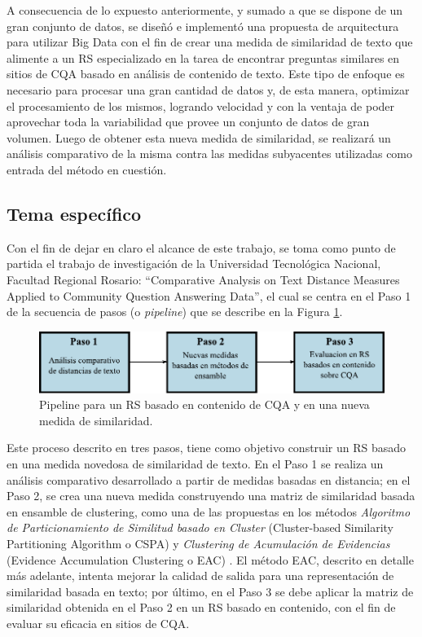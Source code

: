 \bigskip A consecuencia de lo expuesto anteriormente, y sumado a que se dispone de un gran conjunto de datos, se diseñó e implementó una propuesta de arquitectura para utilizar Big Data con el fin de crear una medida de similaridad de texto que alimente a un RS especializado en la tarea de encontrar preguntas similares en sitios de CQA basado en análisis de contenido de texto. Este tipo de enfoque es necesario para procesar una gran cantidad de datos y, de esta manera, optimizar el procesamiento de los mismos, logrando velocidad y con la ventaja de poder aprovechar toda la variabilidad que provee un conjunto de datos de gran volumen. Luego de obtener esta nueva medida de similaridad, se realizará un análisis comparativo de la misma contra las medidas subyacentes utilizadas como entrada del método en cuestión.

\subsection{Tema específico}
\noindent Con el fin de dejar en claro el alcance de este trabajo, se toma como punto de partida el trabajo de investigación de la Universidad Tecnológica Nacional, Facultad Regional Rosario: “Comparative Analysis on Text Distance Measures Applied to Community Question Answering Data”, el cual se centra en el Paso 1 de la secuencia de pasos (o \textit{pipeline}) que se describe en la Figura \ref{fig:pipeline}.
\bigskip
\begin{figure}[h!]
	\centering
	\includegraphics[width=0.9\linewidth]{5_introduccion/imagenes/pipeline}
	\caption{Pipeline para un RS basado en contenido de CQA y en una nueva medida de similaridad.}
	\label{fig:pipeline}
\end{figure}

Este proceso descrito en tres pasos, tiene como objetivo construir un RS basado en una medida novedosa de similaridad de texto. En el Paso 1 se realiza un análisis comparativo desarrollado a partir de medidas basadas en distancia; en el Paso 2, se crea una nueva medida construyendo una matriz de similaridad basada en ensamble de clustering, como una de las propuestas en los métodos \textit{Algoritmo de Particionamiento de Similitud basado en Cluster} (Cluster-based Similarity Partitioning Algorithm o CSPA) \citep{strehl33knowledge} y \textit{Clustering de Acumulación de Evidencias} (Evidence Accumulation Clustering o EAC) \citep{fred2005combining}. El método EAC, descrito en detalle más adelante, intenta mejorar la calidad de salida para una representación de similaridad basada en texto; por último, en el Paso 3 se debe aplicar la matriz de similaridad obtenida en el Paso 2 en un RS basado en contenido, con el fin de evaluar su eficacia en sitios de CQA.

